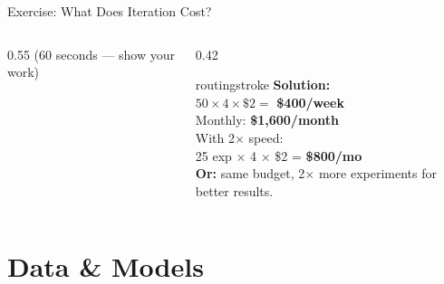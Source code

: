 \documentclass[aspectratio=169, 12pt]{beamer}
\begin{document}
\begin{frame}{Exercise: What Does Iteration Cost?}
\begin{columns}[T]
\begin{column}{0.55\textwidth}
    {\footnotesize\textcolor{midgray}{(60 seconds --- show your work)}}
  \end{column}
  \begin{column}{0.42\textwidth}
    \pause
    \begin{mlsyscard}{routingstroke}
    \textbf{Solution:}\\[0.05cm]
    {\footnotesize
    $50 \times 4 \times \$2 = $ \textbf{\$400/week}\\
    Monthly: \textbf{\$1,600/month}\\[0.05cm]
    With 2$\times$ speed:\\
    25 exp $\times$ 4 $\times$ \$2 = \textbf{\$800/mo}\\[0.05cm]
    \textbf{Or:} same budget, 2$\times$ more experiments for better results.
    }
    \end{mlsyscard}
  \end{column}
\end{columns}

\end{frame}

\section{Data \& Models}
\end{document}
